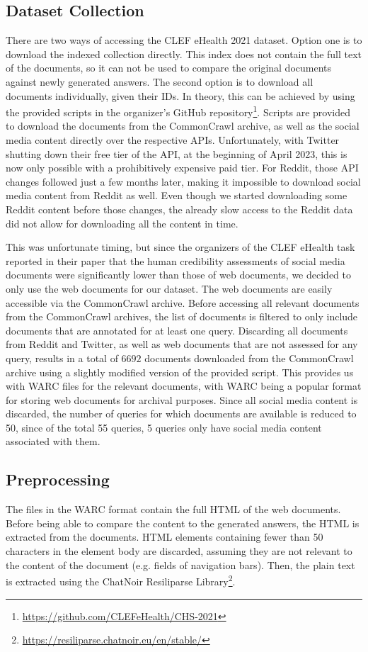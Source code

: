 \subsection{Dataset Collection}
There are two ways of accessing the CLEF eHealth 2021 dataset.
Option one is to download the indexed collection directly.
This index does not contain the full text of the documents, so it can not be used to compare the original documents against newly generated answers.
The second option is to download all documents individually, given their IDs.
In theory, this can be achieved by using the provided scripts in the organizer's GitHub repository\footnote{\url{https://github.com/CLEFeHealth/CHS-2021}}.
Scripts are provided to download the documents from the CommonCrawl archive, as well as the social media content directly over the respective APIs.
Unfortunately, with Twitter shutting down their free tier of the API, at the beginning of April 2023, this is now only possible with a prohibitively expensive paid tier.
For Reddit, those API changes followed just a few months later, making it impossible to download social media content from Reddit as well.
Even though we started downloading some Reddit content before those changes, the already slow access to the Reddit data did not allow for downloading all the content in time.

This was unfortunate timing, but since the organizers of the CLEF eHealth task reported in their paper that the human credibility assessments of social media documents were significantly lower than those of web documents, we decided to only use the web documents for our dataset.
The web documents are easily accessible via the CommonCrawl archive.
Before accessing all relevant documents from the CommonCrawl archives, the list of documents is filtered to only include documents that are annotated for at least one query.
Discarding all documents from Reddit and Twitter, as well as web documents that are not assessed for any query, results in a total of $6692$ documents downloaded from the CommonCrawl archive using a slightly modified version of the provided script.
This provides us with WARC files for the relevant documents, with WARC being a popular format for storing web documents for archival purposes.
Since all social media content is discarded, the number of queries for which documents are available is reduced to 50, since of the total 55 queries, 5 queries only have social media content associated with them.

\subsection{Preprocessing}
The files in the WARC format contain the full HTML of the web documents.
Before being able to compare the content to the generated answers, the HTML is extracted from the documents.
HTML elements containing fewer than 50 characters in the element body are discarded, assuming they are not relevant to the content of the document (e.g. fields of navigation bars).
Then, the plain text is extracted using the ChatNoir Resiliparse Library\footnote{\url{https://resiliparse.chatnoir.eu/en/stable/}}.


